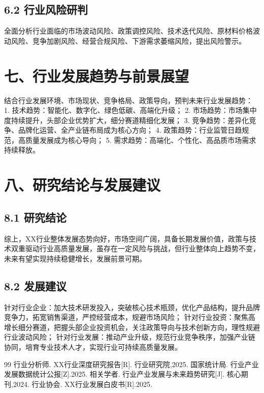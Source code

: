 \documentclass[12pt,a4paper,UTF8]{ctexart}
\begin{document}
\subsection{6.2 行业风险研判}
全面分析行业面临的市场波动风险、政策调控风险、技术迭代风险、原材料价格波动风险、竞争加剧风险、经营合规风险、下游需求萎缩风险，提出风险警示。

\section{七、行业发展趋势与前景展望}
结合行业发展环境、市场现状、竞争格局、政策导向，预判未来行业发展趋势：
1. 技术趋势：智能化、数字化、绿色低碳、高端化升级；
2. 市场趋势：市场集中度持续提升，头部企业优势扩大，细分赛道精细化发展；
3. 竞争趋势：差异化竞争、品牌化运营、全产业链布局成为核心方向；
4. 政策趋势：行业监管日趋规范，高质量发展成为核心导向；
5. 需求趋势：高端化、个性化、高品质市场需求持续释放。

\section{八、研究结论与发展建议}
\subsection{8.1 研究结论}
综上，XX行业整体发展态势向好，市场空间广阔，具备长期发展价值，政策与技术双重驱动行业高质量发展，虽存在一定风险与挑战，但行业整体向上趋势不变，未来有望实现持续稳健增长，发展前景可期。

\subsection{8.2 发展建议}
针对行业企业：加大技术研发投入，突破核心技术瓶颈，优化产品结构，提升品牌竞争力，拓宽销售渠道，严控经营成本，规避市场风险；
针对行业投资：聚焦高增长细分赛道，把握头部企业投资机会，关注政策导向与技术创新方向，理性规避行业波动风险；
针对行业发展：推动产业升级，规范行业竞争秩序，加强产业链协同，培育专业技术人才，实现行业可持续高质量发展。

\newpage
\begin{thebibliography}{99}
 行业分析师. XX行业深度研究报告[R]. 行业研究院,2025.
 国家统计局. 行业产业发展数据统计公报[Z].2025.
 相关学者. 行业产业发展与未来趋势研究[J]. 核心期刊,2024.
 行业协会. XX行业发展白皮书[R].2025.
\end{thebibliography}
\end{document}
